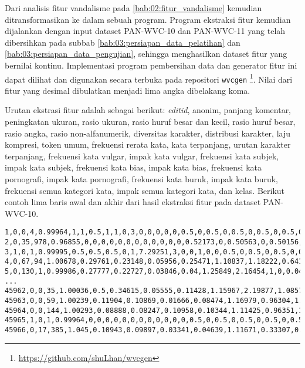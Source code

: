 Dari analisis fitur vandalisme pada \ref{bab:02:fitur_vandalisme} kemudian
ditransformasikan ke dalam sebuah program.
Program ekstraksi fitur kemudian dijalankan dengan input dataset PAN-WVC-10
dan PAN-WVC-11 yang telah dibersihkan pada subbab
\ref{bab:03:persiapan_data_pelatihan} dan
\ref{bab:03:persiapan_data_pengujian},
sehingga menghasilkan dataset fitur yang bernilai kontinu.
Implementasi program pembersihan data dan generator fitur ini dapat dilihat dan
digunakan secara terbuka pada repositori \texttt{wvcgen}
\footnote{\url{https://github.com/shuLhan/wvcgen}}.
Nilai dari fitur yang desimal dibulatkan menjadi lima angka dibelakang koma.

Urutan ekstrasi fitur adalah sebagai berikut: \textit{editid}, anonim,
panjang komentar, peningkatan ukuran, rasio ukuran, rasio huruf besar dan
kecil, rasio huruf besar, rasio angka, rasio non-alfanumerik, diversitas
karakter, distribusi karakter, laju kompresi, token umum, frekuensi rerata
kata, kata terpanjang, urutan karakter terpanjang, frekuensi kata vulgar, impak
kata vulgar, frekuensi kata subjek, impak kata subjek, frekuensi kata bias,
impak kata bias, frekuensi kata pornografi, impak kata pornografi, frekuensi
kata buruk, impak kata buruk, frekuensi semua kategori kata, impak semua
kategori kata, dan kelas. Berikut contoh lima baris awal dan akhir dari hasil
ekstraksi fitur pada dataset PAN-WVC-10.

\begin{lstlisting}[style=data,basicstyle=\scriptsize\ttfamily]
1,0,0,4,0.99964,1,1,0.5,1,1,0,3,0,0,0,0,0,0.5,0,0.5,0,0.5,0,0.5,0,0.5,0,0.5,0
2,0,35,978,0.96855,0,0,0,0,0,0,0,0,0,0,0,0,0.52173,0,0.50563,0,0.50156,0,0.5,0,0.5283,0,0.50534,0
3,1,0,1,0.99995,0.5,0.5,0.5,0,1,7.29251,3,0,0,1,0,0,0.5,0,0.5,0,0.5,0,0.5,0,0.5,0,0.5,0
4,0,67,94,1.00678,0.29761,0.23148,0.05956,0.25471,1.10837,1.18222,0.6415,12,0.02692,10,2,0,0.65,0.3,0.72838,0,0.60606,0,0.5,0,0.77906,0,0.72837,0
5,0,130,1,0.99986,0.27777,0.22727,0.03846,0.04,1.25849,2.16454,1,0,0.04682,8,0,0,0.5,0.5,0.5,0,0.5,0,0.5,0,0.5,0,0.5,0
...
45962,0,0,35,1.00036,0.5,0.34615,0.05555,0.11428,1.15967,2.19877,1.08571,1,0.06435,11,2,0,0.5,0.83333,0.5,0,0.5,0,0.5,0,0.5,0,0.5,0
45963,0,0,59,1.00239,0.11904,0.10869,0.01666,0.08474,1.16979,0.96304,1.03389,3,0.08203,10,2,0,0.5,0.75,0.49878,0,0.5,0,0.5,0,0.5,0,0.49891,0
45964,0,0,144,1.00293,0.08888,0.08247,0.10958,0.10344,1.11425,0.96351,1.01379,3,0,0,2,0,0.5,0,0.5,0,0.5,0,0.5,0,0.5,0,0.5,0
45965,1,0,1,0.99964,0,0,0,0,0,0,0,0,0,0,0,0,0.5,0,0.5,0,0.5,0,0.5,0,0.5,0,0.5,0
45966,0,17,385,1.045,0.10943,0.09897,0.03341,0.04639,1.11671,0.33307,0.76288,4,0.0851,11,2,0.01562,0.5,0.54687,0.5,0,0.5,0,0.5,0,0.5,0,0.5,0
\end{lstlisting}

